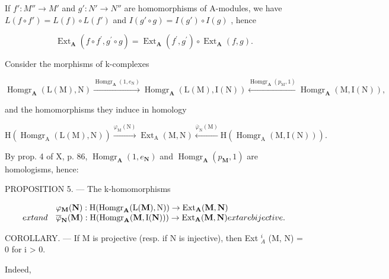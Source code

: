 If \(f': M'' \to M'\) and \(g': N' \to N''\) are homomorphisms of A-modules, we have \(L(f \circ f') = L(f) \circ L(f')\) and \(I(g' \circ g) = I(g') \circ I(g)\) , hence

\[
\operatorname{Ext} _ {\mathbf {A}} \left(f \circ f ^ {\prime}, g ^ {\prime} \circ g\right) = \operatorname{Ext} _ {\mathbf {A}} \left(f ^ {\prime}, g ^ {\prime}\right) \circ \operatorname{Ext} _ {\mathbf {A}} (f, g).\tag{9}
\]

Consider the morphisms of k-complexes

\[
\operatorname{Homgr} _ {\mathbf {A}} (\mathrm{L} (\mathrm{M}), \mathrm{N}) \xrightarrow {\operatorname{Homgr} _ {\mathbf {A}} (1 , e _ {\mathrm{N}})} \operatorname{Homgr} _ {\mathbf {A}} (\mathrm{L} (\mathrm{M}), \mathrm{I} (\mathrm{N})) \xleftarrow {\operatorname{Homgr} _ {\mathbf {A}} (p _ {\mathrm{M}}, 1)} \operatorname{Homgr} _ {\mathbf {A}} (\mathrm{M}, \mathrm{I} (\mathrm{N})),
\]

and the homomorphisms they induce in homology

\[
\mathrm{H} \left(\operatorname{Homgr} _ {\mathrm{A}} (\mathrm{L} (\mathrm{M}), \mathrm{N})\right) \xrightarrow {\varphi_ {\mathrm{M}} (\mathrm{N})} \operatorname{Ext} _ {\mathrm{A}} (\mathrm{M}, \mathrm{N}) \xleftarrow {\overline {{\varphi}} _ {\mathrm{N}} (\mathrm{M})} \mathrm{H} \left(\operatorname{Homgr} _ {\mathrm{A}} (\mathrm{M}, \mathrm{I} (\mathrm{N}))\right).
\]

By prop. 4 of X, p. 86, \(\operatorname{Homgr}_{\mathbf{A}}(1, e_{\mathbf{N}})\) and \(\operatorname{Homgr}_{\mathbf{A}}(p_{\mathbf{M}}, 1)\) are homologisms, hence:

PROPOSITION 5. --- The k-homomorphisms

\[
\begin{array}{l l} & \varphi_ {\mathbf {M}} (\mathbf {N}): \mathrm{H} (\mathrm{Homgr} _ {\mathbf {A}}   (\mathrm{L} (\mathbf {M}), \mathrm{N})) \to \mathrm{Ext} _ {\mathbf {A}}   (\mathbf {M}, \mathbf {N}) \\ 	ext{and} & \overline {{\varphi}} _ {\mathbf {N}} (\mathbf {M}): \mathrm{H} (\mathrm{Homgr} _ {\mathbf {A}}   (\mathbf {M}, \mathrm{I} (\mathbf {N}))) \to \mathrm{Ext} _ {\mathbf {A}}   (\mathbf {M}, \mathbf {N}) 	ext{are bijective.} \end{array}
\]

COROLLARY. --- If M is projective (resp. if N is injective), then Ext \(_{A}^{i}\) (M, N) = 0 for i \textgreater{} 0.

Indeed,

